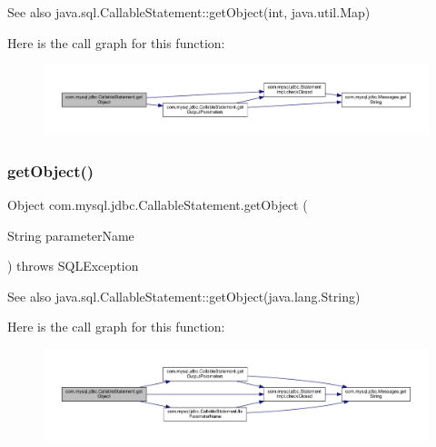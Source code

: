 \begin{DoxySeeAlso}{See also}
java.\+sql.\+Callable\+Statement\+::get\+Object(int, java.\+util.\+Map) 
\end{DoxySeeAlso}
Here is the call graph for this function\+:\nopagebreak
\begin{figure}[H]
\begin{center}
\leavevmode
\includegraphics[width=350pt]{classcom_1_1mysql_1_1jdbc_1_1_callable_statement_a5a628d28a025afcd44718d58d26e6c05_cgraph}
\end{center}
\end{figure}
\mbox{\label{classcom_1_1mysql_1_1jdbc_1_1_callable_statement_ab02d94c34e2da9319a2b5a8256a20713}} 
\subsubsection{\texorpdfstring{get\+Object()}{getObject()}\hspace{0.1cm}{\footnotesize\ttfamily [3/4]}}
{\footnotesize\ttfamily Object com.\+mysql.\+jdbc.\+Callable\+Statement.\+get\+Object (\begin{DoxyParamCaption}\item[{String}]{parameter\+Name }\end{DoxyParamCaption}) throws S\+Q\+L\+Exception}

\begin{DoxySeeAlso}{See also}
java.\+sql.\+Callable\+Statement\+::get\+Object(java.\+lang.\+String) 
\end{DoxySeeAlso}
Here is the call graph for this function\+:\nopagebreak
\begin{figure}[H]
\begin{center}
\leavevmode
\includegraphics[width=350pt]{classcom_1_1mysql_1_1jdbc_1_1_callable_statement_ab02d94c34e2da9319a2b5a8256a20713_cgraph}
\end{center}
\end{figure}
\mbox{\label{classcom_1_1mysql_1_1jdbc_1_1_callable_statement_ac622bfc97a9ee7a1a3658629d2f5d425}} 
